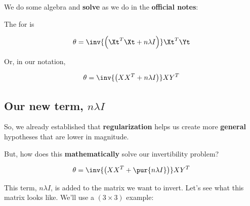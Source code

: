         We do some algebra and \textbf{solve} as we do in the \textbf{official notes}:\\
        
        \begin{kequation}
            The  for  is 
            
            \begin{equation*}
                \theta = 
                \inv{ 
                    \left(  \Xt^T\Xt + n \lambda I \right)  
                }
                \Xt^T  \Yt
            \end{equation*}
            
            Or, in our  notation,
            
            \begin{equation*}
                \theta = 
                \inv{ 
                    \left(  XX^T + n \lambda I \right)  
                }
                XY^T
            \end{equation*}
            
        \end{kequation}
        
    \subsection{Our new term, $n \lambda I$}
    
        So, we already established that \textbf{regularization} helps us create more \textbf{general} hypotheses that are lower in magnitude.
        
        But, how does this \textbf{mathematically} solve our invertibility problem?
        
        \begin{equation}
            \theta = 
                \inv{ 
                    \left(  XX^T + \pur{ n \lambda I } \right)  
                }
                XY^T
        \end{equation}
        
        This term, $n \lambda I$, is added to the matrix we want to invert. Let's see what this matrix looks like. We'll use a $(3 \times 3)$ example:
        
